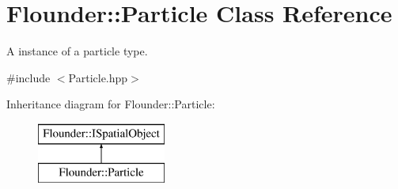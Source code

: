 \hypertarget{class_flounder_1_1_particle}{}\section{Flounder\+:\+:Particle Class Reference}
\label{class_flounder_1_1_particle}


A instance of a particle type.  




{\ttfamily \#include $<$Particle.\+hpp$>$}

Inheritance diagram for Flounder\+:\+:Particle\+:\begin{figure}[H]
\begin{center}
\leavevmode
\includegraphics[height=2.000000cm]{class_flounder_1_1_particle}
\end{center}
\end{figure}
